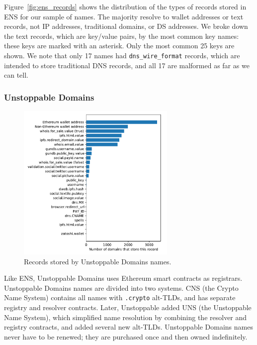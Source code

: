 Figure~\ref{fig:ens_records} shows the distribution of the types of records 
stored in ENS for our sample of names. The majority resolve 
to wallet addresses or text 
records, not IP addresses, traditional domains, or DS addresses. We broke down 
the text records, which are key/value pairs, by the most common key names: 
these keys are marked with an asterisk. Only the most common 25 keys are shown. 
We note that only 17 names had \texttt{dns\_wire\_format} records, which are 
intended to store traditional DNS 
records, and all 17 are malformed as far as we can tell. 

%

\subsubsection{Unstoppable Domains}
\label{sec:unstoppable_overview}

\begin{figure}[t]
	\centering
	\includegraphics[width=3in]{figs/all_unstoppable_records.pdf}
	\caption{Records stored by Unstoppable Domains names.}
	\label{fig:unstoppable_records}
\end{figure}


Like ENS, Unstoppable Domains uses Ethereum smart contracts as 
registrars. Unstoppable Domains names are divided into two systems. CNS 
(the Crypto Name System) contains all names with \texttt{.crypto} 
alt-TLDs, and has separate registry and resolver contracts. Later, Unstoppable 
added UNS 
(the Unstoppable Name System), which simplified name resolution by 
combining the resolver and registry contracts, and added several 
new alt-TLDs. Unstoppable Domains names never have to be renewed; they are 
purchased once and then owned indefinitely.

